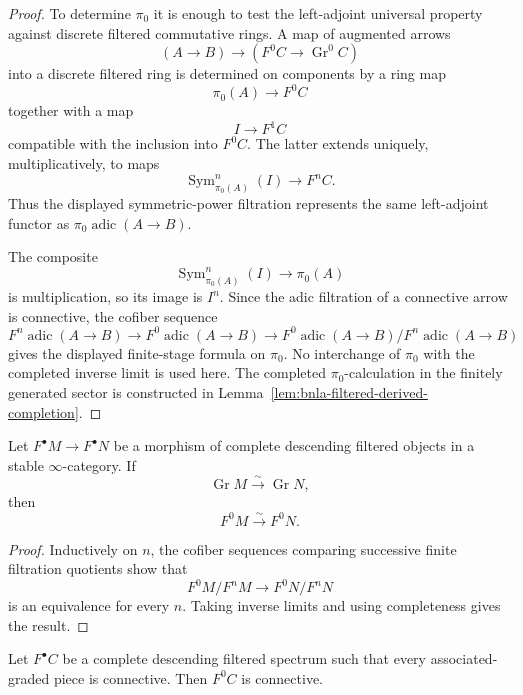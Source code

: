 \begin{proof}
To determine $\pi_0$ it is enough to test the left-adjoint universal property
against discrete filtered commutative rings.  A map of augmented arrows
\[
    (A\to B)
    \longrightarrow
    \left(F^0C\to\operatorname{Gr}^0C\right)
\]
into a discrete filtered ring is determined on components by a ring map
\[
    \pi_0(A)\longrightarrow F^0C
\]
together with a map
\[
    I\longrightarrow F^1C
\]
compatible with the inclusion into $F^0C$.  The latter extends uniquely,
multiplicatively, to maps
\[
    \operatorname{Sym}^n_{\pi_0(A)}(I)
    \longrightarrow
    F^nC.
\]
Thus the displayed symmetric-power filtration represents the same
left-adjoint functor as
$\pi_0\operatorname{adic}(A\to B)$.

The composite
\[
    \operatorname{Sym}^n_{\pi_0(A)}(I)
    \longrightarrow
    \pi_0(A)
\]
is multiplication, so its image is $I^n$.  Since the adic filtration of a
connective arrow is connective, the cofiber sequence
\[
    F^n\operatorname{adic}(A\to B)
    \longrightarrow
    F^0\operatorname{adic}(A\to B)
    \longrightarrow
    F^0\operatorname{adic}(A\to B)/
    F^n\operatorname{adic}(A\to B)
\]
gives the displayed finite-stage formula on $\pi_0$.  No interchange of
$\pi_0$ with the completed inverse limit is used here.  The completed
$\pi_0$-calculation in the finitely generated sector is constructed in
Lemma~\ref{lem:bnla-filtered-derived-completion}.
\end{proof}

\begin{lemma}
\label{lem:bnla-complete-filtered-detection}
Let $F^\bullet M\to F^\bullet N$ be a morphism of complete descending
filtered objects in a stable $\infty$-category.  If
\[
    \operatorname{Gr}M\xrightarrow{\sim}\operatorname{Gr}N,
\]
then
\[
    F^0M\xrightarrow{\sim}F^0N.
\]
\end{lemma}

\begin{proof}
Inductively on $n$, the cofiber sequences comparing successive finite
filtration quotients show that
\[
    F^0M/F^{n}M\longrightarrow F^0N/F^{n}N
\]
is an equivalence for every $n$.  Taking inverse limits and using completeness
gives the result.
\end{proof}

\begin{lemma}
\label{lem:bnla-complete-filtered-connectivity}
Let $F^\bullet C$ be a complete descending filtered spectrum such that every
associated-graded piece is connective.  Then $F^0C$ is connective.
\end{lemma}

